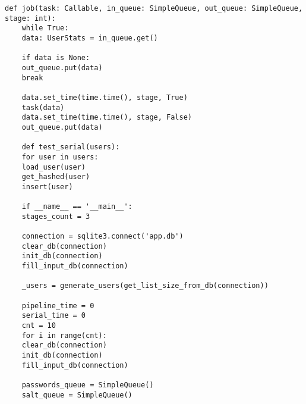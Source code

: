 \documentclass[../report.tex]{subfiles}
\begin{document}
\newpage
\begin{lstlisting}[caption=Файл master.py (часть 3)]
	def job(task: Callable, in_queue: SimpleQueue, out_queue: SimpleQueue, stage: int):
	while True:
	data: UserStats = in_queue.get()
	
	if data is None:
	out_queue.put(data)
	break
	
	data.set_time(time.time(), stage, True)
	task(data)
	data.set_time(time.time(), stage, False)
	out_queue.put(data)
	
	def test_serial(users):
	for user in users:
	load_user(user)
	get_hashed(user)
	insert(user)
	
	if __name__ == '__main__':
	stages_count = 3
	
	connection = sqlite3.connect('app.db')
	clear_db(connection)
	init_db(connection)
	fill_input_db(connection)
	
	_users = generate_users(get_list_size_from_db(connection))
	
	pipeline_time = 0
	serial_time = 0
	cnt = 10
	for i in range(cnt):
	clear_db(connection)
	init_db(connection)
	fill_input_db(connection)
	
	passwords_queue = SimpleQueue()
	salt_queue = SimpleQueue()
\end{lstlisting}
\end{document}

